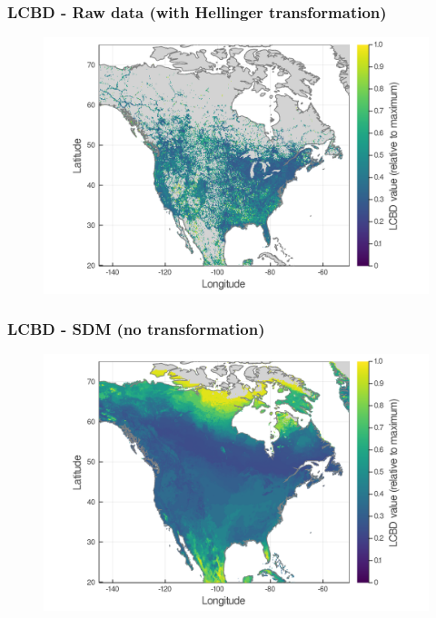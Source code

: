 \documentclass[10pt]{beamer}
\begin{document}
\begin{frame}
  \frametitle{LCBD - Raw data (with Hellinger transformation)}
  \begin{figure}
    \centering
    \hspace*{-0cm}\includegraphics[scale=0.17]{fig/05_raw_lcbd-transf.png}
  \end{figure}
\end{frame}

\begin{frame}
  \frametitle{LCBD - SDM (no transformation)}
  \begin{figure}
    \centering
    \hspace*{-0cm}\includegraphics[scale=0.17]{fig/05_sdm_lcbd.png}
  \end{figure}
\end{frame}
\end{document}
